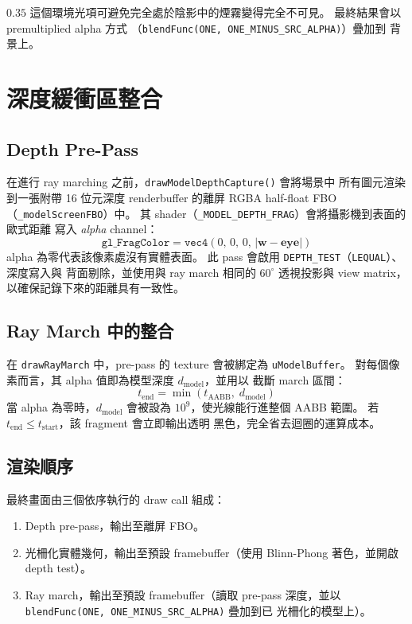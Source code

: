 \documentclass[a4paper, 12pt]{article}
\begin{document}
$0.35$ 這個環境光項可避免完全處於陰影中的煙霧變得完全不可見。
最終結果會以 premultiplied alpha 方式
（\texttt{blendFunc(ONE,\allowbreak\ ONE\_MINUS\_SRC\_ALPHA)}）疊加到
背景上。

\section{深度緩衝區整合}

\subsection{Depth Pre-Pass}

在進行 ray marching 之前，\texttt{drawModelDepthCapture()} 會將場景中
所有圖元渲染到一張附帶 16 位元深度 renderbuffer 的離屏 RGBA half-float
FBO（\texttt{\_modelScreenFBO}）中。
其 shader（\texttt{\_MODEL\_DEPTH\_FRAG}）會將攝影機到表面的歐式距離
寫入 \emph{alpha} channel：
\[
  \texttt{gl\_FragColor} = \texttt{vec4}(0,\,0,\,0,\,|\mathbf{w}-\mathbf{eye}|)
\]
alpha 為零代表該像素處沒有實體表面。
此 pass 會啟用 \texttt{DEPTH\_TEST}（\texttt{LEQUAL}）、深度寫入與
背面剔除，並使用與 ray march 相同的 $60^\circ$ 透視投影與 view matrix，
以確保記錄下來的距離具有一致性。

\subsection{Ray March 中的整合}

在 \texttt{drawRayMarch} 中，pre-pass 的 texture 會被綁定為
\texttt{uModelBuffer}。
對每個像素而言，其 alpha 值即為模型深度 $d_{\text{model}}$，並用以
截斷 march 區間：
\[
  t_{\text{end}} = \min(t_{\text{AABB}},\; d_{\text{model}})
\]
當 alpha 為零時，$d_{\text{model}}$ 會被設為 $10^9$，使光線能行進整個
AABB 範圍。
若 $t_{\text{end}}\le t_{\text{start}}$，該 fragment 會立即輸出透明
黑色，完全省去迴圈的運算成本。

\subsection{渲染順序}

最終畫面由三個依序執行的 draw call 組成：
\begin{enumerate}[nosep]
  \item Depth pre-pass，輸出至離屏 FBO。
  \item 光柵化實體幾何，輸出至預設 framebuffer（使用 Blinn-Phong
        著色，並開啟 depth test）。
  \item Ray march，輸出至預設 framebuffer（讀取 pre-pass 深度，並以
        \texttt{blendFunc(ONE, ONE\_MINUS\_SRC\_ALPHA)} 疊加到已
        光柵化的模型上）。
\end{enumerate}
\end{document}
